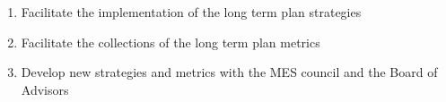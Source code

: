 \begin{enumerate}
  \begin{enumerate}
   \item
    Facilitate the implementation of the long term plan strategies
   \item
    Facilitate the collections of the long term plan metrics
   \item
    Develop new strategies and metrics with the MES council and the Board of Advisors
  \end{enumerate}
\end{enumerate}